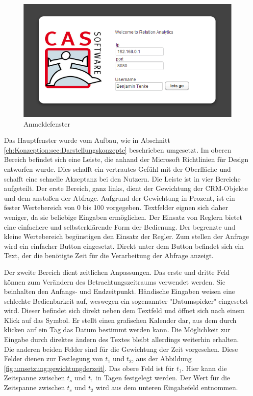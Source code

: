 \begin{figure}[htbp]
\centering
\includegraphics[scale=2.0]{pics/login.png}
\caption{Anmeldefenster}
\label{ergebniss_oberflaeche_anmeld}
\end{figure}

Das Hauptfenster wurde vom Aufbau, wie in Abschnitt \ref{ch:Konzeption:sec:Darstellungskonzepte} beschrieben umgesetzt. Im oberen Bereich befindet sich eine Leiste, die anhand der Microsoft Richtlinien für Design entworfen wurde. Dies schafft ein vertrautes Gefühl mit der Oberfläche und schafft eine schnelle Akzeptanz bei den Nutzern. Die Leiste ist in vier Bereiche aufgeteilt. Der erste Bereich, ganz links, dient der Gewichtung der CRM-Objekte und dem anstoßen der Abfrage. Aufgrund der Gewichtung in Prozent, ist ein fester Wertebereich von 0 bis 100 vorgegeben. Textfelder eignen sich daher weniger, da sie beliebige Eingaben ermöglichen. Der Einsatz von Reglern bietet eine einfachere und selbsterklärende Form der Bedienung. Der begrenzte und kleine Wertebereich begünstigen den Einsatz der Regler. Zum stellen der Anfrage wird ein einfacher Button eingesetzt. Direkt unter dem Button befindet sich ein Text, der die benötigte Zeit für die Verarbeitung der Abfrage anzeigt. 

Der zweite Bereich dient zeitlichen Anpassungen. Das erste und dritte Feld können zum Verändern des Betrachtungszeitraums verwendet werden. Sie beinhalten den Anfangs- und Endzeitpunkt. Händische Eingaben weisen eine schlechte Bedienbarkeit auf, weswegen ein sogenannter "Datumspicker" eingesetzt wird. Dieser befindet sich direkt neben dem Textfeld und öffnet sich nach einem Klick auf das Symbol. Er stellt einen grafischen Kalender dar, aus dem durch klicken auf ein Tag das Datum bestimmt werden kann. Die Möglichkeit zur Eingabe durch direktes ändern des Textes bleibt allerdings weiterhin erhalten. Die anderen beiden Felder sind für die Gewichtung der Zeit vorgesehen. Diese Felder dienen zur Festlegung von $t_1$ und $t_2$, aus der Abbildung \ref{fig:umsetzung:gewichtungderzeit}. Das obere Feld ist für $t_1$. Hier kann die Zeitspanne zwischen $t_{s}$ und $t_1$ in Tagen festgelegt werden. Der Wert für die Zeitspanne zwischen $t_{e}$ und $t_2$ wird aus dem unteren Eingabefeld entnommen.

